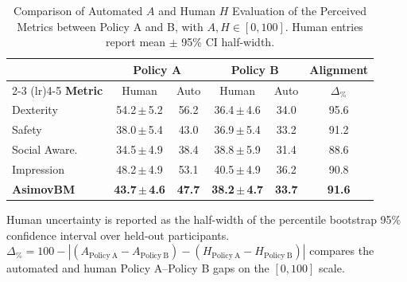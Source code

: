 \begin{table}[!ht]
\centering
\caption{Comparison of Automated $A$ and Human $H$ Evaluation of the Perceived Metrics between Policy A and B, with $A, H \in [0, 100]$. Human entries report mean $\pm$ 95\% CI half-width.}
\label{tab:metrics}
\footnotesize
\begin{tabular}{lccccc}
\toprule
& \multicolumn{2}{c}{\textbf{Policy A}} & \multicolumn{2}{c}{\textbf{Policy B}} & \textbf{Alignment} \\
\cmidrule(lr){2-3} \cmidrule(lr){4-5}
\textbf{Metric} & {Human} & {Auto} & {Human} & {Auto} & {$\Delta_{\%}$} \\
\midrule
Dexterity & 54.2\,$\pm$\,5.2 & 56.2 & 36.4\,$\pm$\,4.6 & 34.0 & 95.6 \\
Safety & 38.0\,$\pm$\,5.4 & 43.0 & 36.9\,$\pm$\,5.4 & 33.2 & 91.2 \\
Social Aware. & 34.5\,$\pm$\,4.9 & 38.4 & 38.8\,$\pm$\,5.9 & 31.4 & 88.6 \\
Impression & 48.2\,$\pm$\,4.9 & 53.1 & 40.5\,$\pm$\,4.9 & 36.2 & 90.8 \\
\midrule
\textbf{AsimovBM} & \textbf{43.7\,$\pm$\,4.6} & \textbf{47.7} & \textbf{38.2\,$\pm$\,4.7} & \textbf{33.7} & \textbf{91.6} \\
\bottomrule
\end{tabular}
\begin{flushleft}
\scriptsize Human uncertainty is reported as the half-width of the percentile bootstrap 95\% confidence interval over held-out participants. $\Delta_{\%}=100-\left|\left(A_{\mathrm{Policy\ A}}-A_{\mathrm{Policy\ B}}\right)-\left(H_{\mathrm{Policy\ A}}-H_{\mathrm{Policy\ B}}\right)\right|$ compares the automated and human Policy A--Policy B gaps on the $[0,100]$ scale.
\end{flushleft}
\end{table}